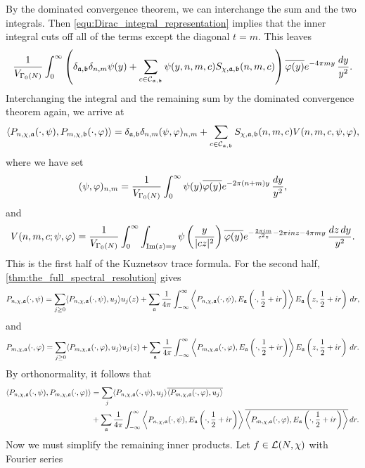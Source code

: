 \documentclass[12pt,oneside]{book}
\begin{document}
    By the dominated convergence theorem, we can interchange the sum and the two integrals. Then \cref{equ:Dirac_integral_representation} implies that the inner integral cuts off all of the terms except the diagonal $t = m$. This leaves
    \[
      \frac{1}{V_{\Gamma_{0}(N)}}\int_{0}^{\infty}\left(\delta_{\mathfrak{a},\mathfrak{b}}\delta_{n,m}\psi(y)+\sum_{\substack{c \in \mathcal{C}_{\mathfrak{a},\mathfrak{b}}}}\psi(y,n,m,c)S_{\chi,\mathfrak{a},\mathfrak{b}}(n,m,c)\right)\overline{\varphi(y)}e^{-4\pi my}\,\frac{dy}{y^{2}}.
    \]
    Interchanging the integral and the remaining sum by the dominated convergence theorem again, we arrive at
    \[
      \langle P_{n,\chi,\mathfrak{a}}(\cdot,\psi),P_{m,\chi,\mathfrak{b}}(\cdot,\varphi)\rangle = \delta_{\mathfrak{a},\mathfrak{b}}\delta_{n,m}(\psi,\varphi)_{n,m}+\sum_{c \in \mathcal{C}_{\mathfrak{a},\mathfrak{b}}}S_{\chi,\mathfrak{a},\mathfrak{b}}(n,m,c)V(n,m,c,\psi,\varphi),
    \]
    where we have set
    \[
      (\psi,\varphi)_{n,m} = \frac{1}{V_{\Gamma_{0}(N)}}\int_{0}^{\infty}\psi(y)\overline{\varphi(y)}e^{-2\pi(n+m)y}\,\frac{dy}{y^{2}},
    \]
    and
    \[
      V(n,m,c;\psi,\varphi) = \frac{1}{V_{\Gamma_{0}(N)}}\int_{0}^{\infty}\int_{\mathrm{Im}(z) = y}\psi\left(\frac{y}{|cz|^{2}}\right)\overline{\varphi(y)}e^{-\frac{2\pi im}{c^{2}z}-2\pi inz-4\pi my}\,\frac{dz\,dy}{y^{2}}.
    \]
    This is the first half of the Kuznetsov trace formula. For the second half, \cref{thm:the_full_spectral_resolution} gives
    \[
      P_{n,\chi,\mathfrak{a}}(\cdot,\psi) = \sum_{j \ge 0}\langle P_{n,\chi,\mathfrak{a}}(\cdot,\psi),u_{j}\rangle u_{j}(z)+\sum_{\mathfrak{a}}\frac{1}{4\pi}\int_{-\infty}^{\infty}\left\langle P_{n,\chi,\mathfrak{a}}(\cdot,\psi),E_{\mathfrak{a}}\left(\cdot,\frac{1}{2}+ir\right)\right\rangle E_{\mathfrak{a}}\left(z,\frac{1}{2}+ir\right)\,dr,
    \]
    and
    \[
      P_{m,\chi,\mathfrak{a}}(\cdot,\varphi) = \sum_{j \ge 0}\langle P_{m,\chi,\mathfrak{a}}(\cdot,\varphi),u_{j}\rangle u_{j}(z)+\sum_{\mathfrak{a}}\frac{1}{4\pi}\int_{-\infty}^{\infty}\left\langle P_{m,\chi,\mathfrak{a}}(\cdot,\varphi),E_{\mathfrak{a}}\left(\cdot,\frac{1}{2}+ir\right)\right\rangle E_{\mathfrak{a}}\left(z,\frac{1}{2}+ir\right)\,dr.
    \]
    By orthonormality, it follows that
    \begin{align*}
      \langle P_{n,\chi,\mathfrak{a}}(\cdot,\psi),P_{m,\chi,\mathfrak{a}}(\cdot,\varphi)\rangle &= \sum_{j}\langle P_{n,\chi,\mathfrak{a}}(\cdot,\psi),u_{j}\rangle\overline{\langle P_{m,\chi,\mathfrak{a}}(\cdot,\varphi),u_{j}\rangle} \\
      &+\sum_{\mathfrak{a}}\frac{1}{4\pi}\int_{-\infty}^{\infty}\left\langle P_{n,\chi,\mathfrak{a}}(\cdot,\psi),E_{\mathfrak{a}}\left(\cdot,\frac{1}{2}+ir\right)\right\rangle\overline{\left\langle P_{m,\chi,\mathfrak{a}}(\cdot,\varphi),E_{\mathfrak{a}}\left(\cdot,\frac{1}{2}+ir\right)\right\rangle}\,dr.
    \end{align*}
    Now we must simplify the remaining inner products. Let $f \in \mathcal{L}(N,\chi)$ with Fourier series
\end{document}
